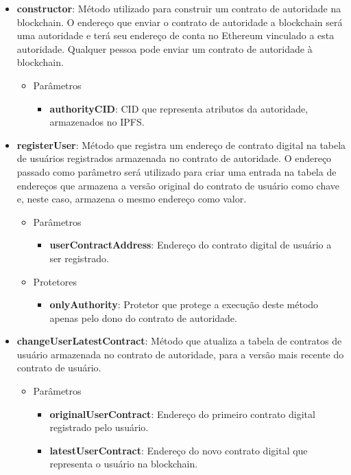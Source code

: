 \documentclass[tcc,capa]{texufpel}
\begin{document}
    \begin{itemize}
        \item \textbf{constructor}: Método utilizado para construir um contrato de autoridade na blockchain. O endereço que enviar o contrato de autoridade a blockchain será uma autoridade e terá seu endereço de conta no Ethereum vinculado a esta autoridade. Qualquer pessoa pode enviar um contrato de autoridade à blockchain.
        \begin{itemize}
            \item Parâmetros
            \begin{itemize}
                \item \textbf{authorityCID}: CID que representa atributos da autoridade, armazenados no IPFS.
            \end{itemize}
        \end{itemize}
        
        \item \textbf{registerUser}: Método que registra um endereço de contrato digital na tabela de usuários registrados armazenada no contrato de autoridade. O endereço passado como parâmetro será utilizado para criar uma entrada na tabela de endereços que armazena a versão original do contrato de usuário como chave e, neste caso, armazena o mesmo endereço como valor.
        \begin{itemize}
            \item Parâmetros
            \begin{itemize}
                \item \textbf{userContractAddress}: Endereço do contrato digital de usuário a ser registrado.
            \end{itemize}
            
            \item Protetores
            \begin{itemize}
                \item \textbf{onlyAuthority}: Protetor que protege a execução deste método apenas pelo dono do contrato de autoridade.
            \end{itemize}
        \end{itemize}
        
        \item \textbf{changeUserLatestContract}: Método que atualiza a tabela de contratos de usuário armazenada no contrato de autoridade, para a versão mais recente do contrato de usuário.
        \begin{itemize}
            \item Parâmetros
            \begin{itemize}
                \item \textbf{originalUserContract}: Endereço do primeiro contrato digital registrado pelo usuário.
                \item \textbf{latestUserContract}: Endereço do novo contrato digital que representa o usuário na blockchain.
            \end{itemize}
            

\end{itemize}
\end{itemize}
\end{document}

